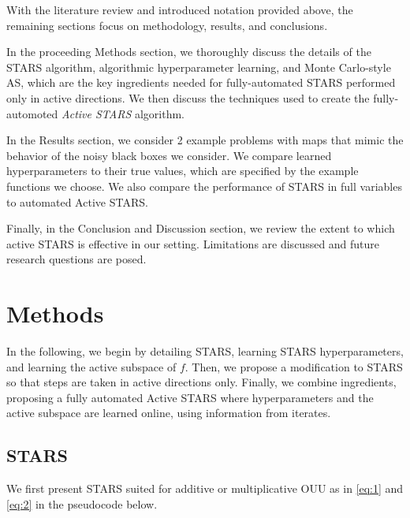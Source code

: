 \documentclass{amsart}
\begin{document}
\vspace{1cm}

With the literature review and introduced notation provided above, the remaining sections focus on methodology, results, and conclusions. 

In the proceeding Methods section, we thoroughly discuss the details of the STARS algorithm, algorithmic hyperparameter learning, and Monte Carlo-style AS, which are the key ingredients needed for fully-automated STARS performed only in active directions. We then discuss the techniques used to create the fully-automoted \textit{Active STARS} algorithm.

In the Results section, we consider 2 example problems with maps that mimic the behavior of the noisy black boxes we consider. We compare learned hyperparameters to their true values, which are specified by the example functions we choose. We also compare the performance of STARS in full variables to automated Active STARS.

Finally, in the Conclusion and Discussion section, we review the extent to which active STARS is effective in our setting. Limitations are discussed and future research questions are posed. 

\section{Methods}

In the following, we begin by detailing STARS, learning STARS hyperparameters, and learning the active subspace of $f$. Then, we propose a modification to STARS so that steps are taken in active directions only. Finally, we combine ingredients, proposing a fully automated Active STARS where hyperparameters and the active subspace are learned online, using information from iterates.


\subsection{STARS}

We first present STARS suited for additive or multiplicative OUU as in \eqref{eq:1} and \eqref{eq:2} in the  pseudocode below.

\vspace{.25cm}
\end{document}
